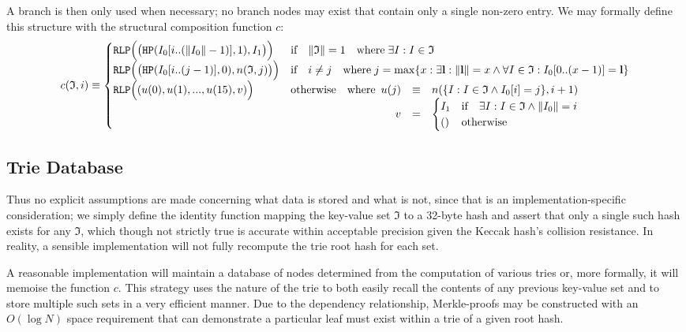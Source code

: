 \documentclass[9pt,oneside]{amsart}
\begin{document}
A branch is then only used when necessary; no branch nodes may exist that contain only a single non-zero entry. We may formally define this structure with the structural composition function $c$:
\begin{equation}
c(\mathfrak{I}, i) \equiv \begin{cases}
\texttt{RLP}\Big( \big(\texttt{HP}(I_0[i .. (\lVert I_0\rVert - 1)], 1), I_1 \big) \Big) & \text{if} \quad \lVert \mathfrak{I} \rVert = 1 \quad \text{where} \; \exists I: I \in \mathfrak{I} \\
\texttt{RLP}\Big( \big(\texttt{HP}(I_0[i .. (j - 1)], 0), n(\mathfrak{I}, j) \big) \Big) & \text{if} \quad i \ne j \quad \text{where} \; j = \max \{ x : \exists \mathbf{l}: \lVert \mathbf{l} \rVert = x \wedge \forall I \in \mathfrak{I}: I_0[0 .. (x - 1)] = \mathbf{l} \} \\
\texttt{RLP}\Big( (u(0), u(1), ..., u(15), v) \Big) & \text{otherwise} \quad \text{where} \begin{array}[t]{rcl}
u(j) & \equiv & n(\{ I : I \in \mathfrak{I} \wedge I_0[i] = j \}, i + 1) \\
v & = & \begin{cases}
I_1 & \text{if} \quad \exists I: I \in \mathfrak{I} \wedge \lVert I_0 \rVert = i \\
() & \text{otherwise}
\end{cases}
\end{array}
\end{cases}
\end{equation}

\subsection{Trie Database}
Thus no explicit assumptions are made concerning what data is stored and what is not, since that is an implementation-specific consideration; we simply define the identity function mapping the key-value set $\mathfrak{I}$ to a 32-byte hash and assert that only a single such hash exists for any $\mathfrak{I}$, which though not strictly true is accurate within acceptable precision given the Keccak hash's collision resistance. In reality, a sensible implementation will not fully recompute the trie root hash for each set.

A reasonable implementation will maintain a database of nodes determined from the computation of various tries or, more formally, it will memoise the function $c$. This strategy uses the nature of the trie to both easily recall the contents of any previous key-value set and to store multiple such sets in a very efficient manner. Due to the dependency relationship, Merkle-proofs may be constructed with an $O(\log N)$ space requirement that can demonstrate a particular leaf must exist within a trie of a given root hash.
\end{document}
